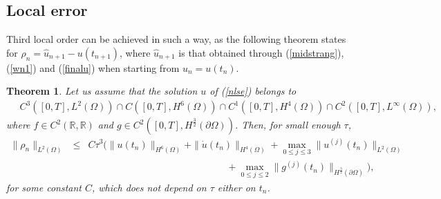 \documentclass[a4paper,12pt]{article}
\newtheorem{theorem}{Theorem}
\begin{document}
\subsection{Local error}
Third local order can be achieved in such a way, as the following theorem states for $\rho_n=\hat{u}_{n+1}-u(t_{n+1})$, where $\hat{u}_{n+1}$ is that obtained through (\ref{midstrang}),(\ref{wn1}) and (\ref{finalu}) when starting from $u_n=u(t_n)$.
\begin{theorem}
Let us assume that the solution $u$ of (\ref{nlse}) belongs to
\begin{eqnarray}
\quad C^3([0,T], L^2(\Omega))\cap C([0,T], H^6(\Omega))  \cap C^1([0,T], H^4(\Omega)) \cap C^2([0,T],L^{\infty}(\Omega)),
\label{reg2}
\end{eqnarray}
where $f\in C^2(\mathbb{R}, \mathbb{R})$ and $g\in C^2([0,T], H^{\frac{3}{2}}(\partial \Omega))$. Then, for small enough $\tau$,
\begin{eqnarray}
\|\rho_n\|_{L^2(\Omega)} &\le& C \tau^3 (\|u(t_n)\|_{H^6(\Omega)}+\|\dot{u}(t_n)\|_{H^4(\Omega)}
+\max_{0\le j \le 3} \|u^{(j)}(t_n)\|_{L^2(\Omega)}
\nonumber \\
&&\hspace{6cm}+\max_{0\le j \le 2}\|g^{(j)}(t_n)\|_{H^{\frac{3}{2}}(\partial \Omega)}),
\label{cotaloc}
\end{eqnarray}
for some constant $C$, which does not depend on $\tau$ either on $t_n$.
\label{thloc}
\end{theorem}
\end{document}
